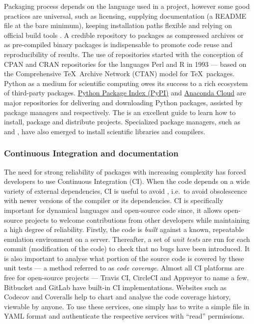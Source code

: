 Packaging process depends on the language used in a project, however some good
practices are universal, such as licensing, supplying documentation (a README
file at the bare minimum), keeping installation paths flexible and relying on
official build tools \citep{taschuk_ten_2017}.
%
A credible repository to packages as compressed archives or as pre-compiled binary
packages is indispensable to promote code reuse and reproducibility of results.
%
The use of repositories started with the conception of
CPAN and CRAN repositories for the languages Perl and R in 1993 --- based on
the Comprehensive \TeX\ Archive Network (CTAN) model for \TeX\ packages. 
%
Python as a medium for scientific computing owes its success to a rich
ecosystem of third-party packages. \href{https://pypi.org}{Python Package
Index (PyPI)} and \href{https://anaconda.org}{Anaconda Cloud} are major
repositories for delivering and downloading Python packages, assisted by
package managers  and  respectively. The
 is an
excellent guide to learn how to install, package and distribute projects.
Specialized package managers, such as  and , have
also emerged to install scientific libraries and compilers.

\subsubsection{Continuous Integration and documentation} The need for
strong reliability of packages with increasing complexity has forced developers
to use Continuous Integration (CI).
%
When the code depends on a wide variety of external dependencies, CI is useful
to avoid ,
i.e.\ to avoid obsolescence with newer versions of the compiler or its
dependencies. CI is specifically important for dynamical languages and
open-source code since, it allows open-source projects to welcome contributions
from other developers while maintaining a high degree of reliability.
%
Firstly, the code is \emph{built} against a known, repeatable emulation
environment on a server. Thereafter, a set of \emph{unit tests} are run for
each commit (modification of the code) to check that no bugs have been
introduced. It is also important to analyse what portion of the source code is
covered by these unit tests --- a method referred to as \emph{code coverage}.
%
Almost all CI platforms are free for open-source projects --- Travis CI,
CircleCI and Appveyor to name a few. Bitbucket and GitLab have built-in CI
implementations. Websites such as Codecov and Coveralls help to chart and
analyse the code coverage history, viewable by anyone. To use these services,
one simply has to write a simple file in YAML format and authenticate the
respective services with ``read'' permissions.

